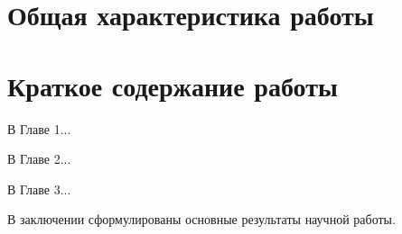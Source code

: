 
\section*{Общая характеристика работы}

\newcommand{\actuality}{\pdfbookmark[1]{Актуальность}{actuality}\textbf{Актуальность темы.}\enspace\ignorespaces}
\newcommand{\aim}{\pdfbookmark[1]{Цель}{aim}\textbf{Цель работы.}\enspace\ignorespaces}
\newcommand{\tasks}{\pdfbookmark[1]{Задачи}{tasks}\textbf{Задачи работы.}\enspace\ignorespaces}
\newcommand{\novelty}{\pdfbookmark[1]{Новизна}{novelty}\textbf{Научная новизна.}\enspace\ignorespaces}
\newcommand{\influence}{\pdfbookmark[1]{Значимость}{influence}\textbf{Теоретическая и практическая значимость.}\enspace\ignorespaces}
\newcommand{\methods}{\pdfbookmark[1]{Методы}{methods}\textbf{Методы и инструменты исследования.}\enspace\ignorespaces}
\newcommand{\defpositions}{\pdfbookmark[1]{Положения}{defpositions}\textbf{Основные положения, выносимые на защиту.}\enspace\ignorespaces}
\newcommand{\relevance}{\pdfbookmark[1]{Соответствие специальности}{relevance}\textbf{Соответствие специальность.}\enspace\ignorespaces}
\newcommand{\reliability}{\pdfbookmark[1]{Достоверность}{reliability}\textbf{Достоверность результатов проведённых исследований.}\enspace\ignorespaces}
\newcommand{\probation}{\pdfbookmark[1]{Апробация}{probation}\textbf{Апробация работы.}\enspace\ignorespaces}
\newcommand{\contribution}{\pdfbookmark[1]{Вклад}{contribution}\textbf{Личный вклад автора.}\enspace\ignorespaces}
\newcommand{\publications}{\pdfbookmark[1]{Публикации}{publications}\textbf{Публикации по теме диссертации.}\enspace\ignorespaces}




\section*{Краткое содержание работы}

В Главе 1...

В Главе 2...

В Главе 3...

В заключении сформулированы основные результаты научной работы.


